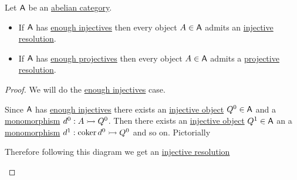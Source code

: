 \documentclass[../../../main]{subfiles}
\begin{document}
\begin{lemma}
  Let \(\mathsf{A}\) be an \hyperref[def:abelian-category]{abelian category}.
  \begin{itemize}
    \item If \(\mathsf{A}\) has \hyperref[def:enough-injectives-projectives]{enough injectives} then every object \(A \in \mathsf{A}\) admits an \hyperref[def:injective-projective-resolution]{injective resolution}.
    \item If \(\mathsf{A}\) has \hyperref[def:enough-injectives-projectives]{enough projectives} then every object \(A \in \mathsf{A}\) admits a \hyperref[def:injective-projective-resolution]{projective resolution}.
  \end{itemize}
\end{lemma}
\begin{proof}
  We will do the \hyperref[def:enough-injectives-projectives]{enough injectives} case.

  Since \(\mathsf{A}\) has \hyperref[def:enough-injectives-projectives]{enough injectives} there exists an \hyperref[def:injective-projective-object]{injective object} \(Q^{0} \in \mathsf{A}\) and a \hyperref[def:mono-epi-morphism]{monomorphism} \(d^{0}: A \rightarrowtail Q^{0}\).
  Then there exists an \hyperref[def:injective-projective-object]{injective object} \(Q^{1} \in \mathsf{A}\) an a \hyperref[def:mono-epi-morphism]{monomorphism} \(d^{1}: \operatorname*{coker}  d^{0} \rightarrowtail Q^{0}\) and so on.
  Pictorially
  \begin{center}
  \end{center}
  Therefore following this diagram we get an \hyperref[def:injective-projective-resolution]{injective resolution}
  \begin{center}
  \end{center}

\end{proof}
\end{document}
